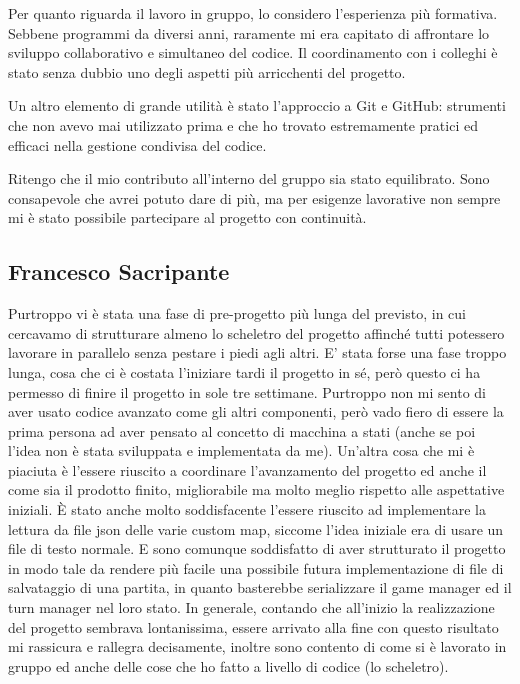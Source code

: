 \documentclass[a4paper,12pt]{report}
\begin{document}
Per quanto riguarda il lavoro in gruppo, lo considero l'esperienza più formativa.
Sebbene programmi da diversi anni, raramente mi era capitato di affrontare lo sviluppo collaborativo e simultaneo del codice.
Il coordinamento con i colleghi è stato senza dubbio uno degli aspetti più arricchenti del progetto.

Un altro elemento di grande utilità è stato l'approccio a Git e GitHub: strumenti che non avevo mai utilizzato prima e che ho trovato estremamente pratici ed efficaci nella gestione condivisa del codice.

Ritengo che il mio contributo all'interno del gruppo sia stato equilibrato. Sono consapevole che avrei potuto dare di più,
ma per esigenze lavorative non sempre mi è stato possibile partecipare al progetto con continuità.

\subsection{Francesco Sacripante}
Purtroppo vi è stata una fase di pre-progetto più lunga del previsto, in cui cercavamo di strutturare almeno lo scheletro del progetto affinché tutti potessero lavorare in parallelo senza pestare i piedi agli altri.
E' stata forse una fase troppo lunga, cosa che ci è costata l'iniziare tardi il progetto in sé, però questo ci ha permesso di finire il progetto in sole tre settimane.
Purtroppo non mi sento di aver usato codice avanzato come gli altri componenti, però vado fiero di essere la prima persona ad aver pensato al concetto di macchina a stati (anche se poi l'idea non è stata sviluppata e implementata da me).
Un'altra cosa che mi è piaciuta è l'essere riuscito a coordinare l'avanzamento del progetto ed anche il come sia il prodotto finito, migliorabile ma molto meglio rispetto alle aspettative iniziali.
È stato anche molto soddisfacente l'essere riuscito ad implementare la lettura da file json delle varie custom map, siccome l'idea iniziale era di usare un file di testo normale.
E sono comunque soddisfatto di aver strutturato il progetto in modo tale da rendere più facile una possibile futura implementazione di file di salvataggio di una partita, in quanto basterebbe serializzare il game manager ed il turn manager nel loro stato.
In generale, contando che all'inizio la realizzazione del progetto sembrava lontanissima, essere arrivato alla fine con questo risultato mi rassicura e rallegra decisamente, inoltre sono contento di come si è lavorato in gruppo ed anche delle cose che ho fatto a livello di codice (lo scheletro).
\end{document}
